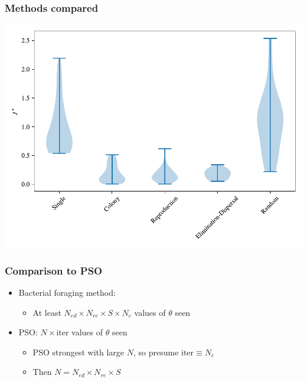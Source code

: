\documentclass{beamer}
\begin{document}
\begin{frame}
\end{frame}

\begin{frame}
\frametitle{Methods compared}
\begin{center}
\includegraphics[scale=0.5]{assets/compared}
\end{center}
\end{frame}

\begin{frame}
\frametitle{Comparison to PSO}
\begin{itemize}
  \item Bacterial foraging method:
  \begin{itemize}
    \item   At least $N_{ed} \times N_{re} \times S \times N_c$ values of $\theta$ seen
  \end{itemize}
  \item PSO: $N \times \text{iter}$ values of $\theta$ seen
  \begin{itemize}
    \item PSO strongest with large $N$, so presume $\text{iter} \equiv N_c$
    \item Then $N = N_{ed} \times N_{re} \times S$
  \end{itemize}
\end{itemize}
\end{frame}
\end{document}
